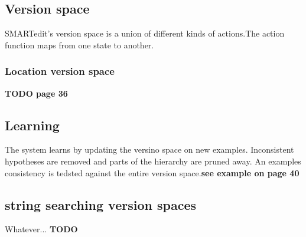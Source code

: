 \subsection{Version space}
SMARTedit's version space is a union of different kinds of actions.The action function maps from one state to another.
\subsubsection{Location version space}
\textbf{TODO page 36}
\subsection{Learning}
The system learns by updating the versino space on new examples. Inconsistent hypotheses are removed and parts of the hierarchy are pruned away. An examples consistency is tedsted against the entire version space.\textbf{see example on page 40}  \\
\subsection{string searching version spaces}
Whatever... \textbf{TODO}
